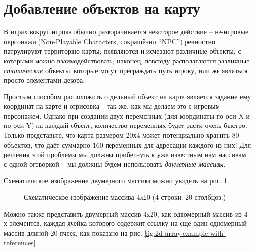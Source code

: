\documentclass[../sparc.tex]{subfiles}
\begin{document}
\section{Добавление объектов на карту}

В играх вокруг игрока обычно разворачивается некоторое действие -- не-игровые
персонажи (Non-Playable Characters, сокращённо ``NPC'') ревностно патрулируют
территорию карты; появляются и исчезают различные объекты, с которыми можно
взаимодействовать; наконец, повсюду располагаются различные \emph{статические}
объекты, которые могут преграждать путь игроку, или же являться просто
элементами декора.

Простым способом расположить отдельный объект на карте является задание ему
координат на карте и отрисовка -- так же, как мы делаем это с игровым
персонажем.  Однако при создании двух переменных (для координаты по оси X и по
оси Y) на каждый объект, количество переменных будет расти очень быстро.  Только
представьте, что карта размером 20х4 может потенциально хранить 80 объектов, что
даёт суммарно 160 переменных для адресации каждого из них!  Для решения этой
проблемы мы должны прибегнуть к уже известным нам массивам, с одной оговоркой --
мы должны будем использовать \emph{двумерные массивы}.

Схематическое изображение двумерного массива можно увидеть на
рис. \ref{fig:2d-array-example}.

\begin{figure}[ht]
  \centering
  \caption{Схематическое изображение массива 4x20 (4 строки, 20 столбцов.)}
  \label{fig:2d-array-example}
\end{figure}

Можно также представить двумерный массив 4x20, как одномерный массив из 4-х
элементов, каждая ячейка которого содержит ссылку на ещё один одномерный массив
длиной 20 ячеек, как показано на
рис. \ref{fig:2d-array-example-with-references}.
\end{document}
